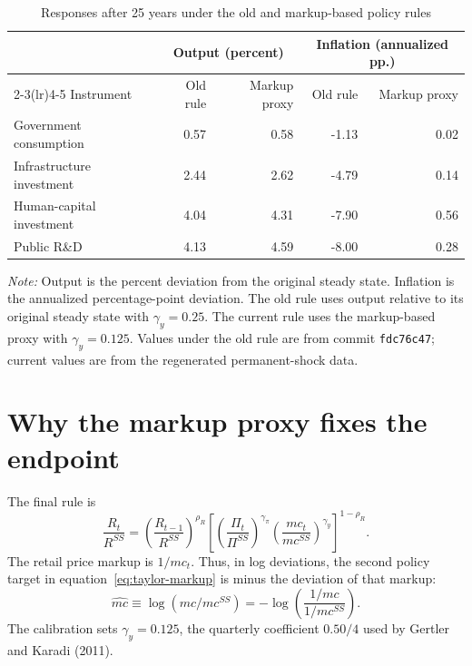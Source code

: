 \documentclass[10pt]{article}
\newcommand{\ssval}[1]{{#1}^{SS}}
\begin{document}
\begin{table}[ht]
    \centering
    \small
    \caption{Responses after 25 years under the old and markup-based policy rules}
    \label{tab:comparison}
    \begin{tabular}{lrrrr}
        \toprule
        & \multicolumn{2}{c}{Output (percent)}
        & \multicolumn{2}{c}{Inflation (annualized pp.)} \\
        \cmidrule(lr){2-3}\cmidrule(lr){4-5}
        Instrument & Old rule & Markup proxy & Old rule & Markup proxy \\
        \midrule
        Government consumption    & 0.57 & 0.58 & -1.13 & 0.02 \\
        Infrastructure investment & 2.44 & 2.62 & -4.79 & 0.14 \\
        Human-capital investment  & 4.04 & 4.31 & -7.90 & 0.56 \\
        Public R\&D                & 4.13 & 4.59 & -8.00 & 0.28 \\
        \bottomrule
    \end{tabular}

    \vspace{0.4em}
    \parbox{0.92\textwidth}{\footnotesize
    \textit{Note:} Output is the percent deviation from the original steady state.
    Inflation is the annualized percentage-point deviation.
    The old rule uses output relative to its original steady state with
    $\gamma_y=0.25$. The current rule uses the markup-based proxy with
    $\gamma_y=0.125$. Values under the old rule are from commit
    \texttt{fdc76c47}; current values are from the regenerated permanent-shock data.}
\end{table}

\section{Why the markup proxy fixes the endpoint}

The final rule is
\begin{equation}\label{eq:taylor-markup}
    \frac{R_t}{\ssval{R}}
    =
    \left(\frac{R_{t-1}}{\ssval{R}}\right)^{\rho_R}
    \left[
        \left(\frac{\Pi_t}{\ssval{\Pi}}\right)^{\gamma_\pi}
        \left(\frac{mc_t}{\ssval{mc}}\right)^{\gamma_y}
    \right]^{1-\rho_R}.
\end{equation}
The retail price markup is $1/mc_t$.
Thus, in log deviations, the second policy target in
equation~\eqref{eq:taylor-markup} is minus the deviation of that markup:
\begin{equation}
    \widehat{mc}
    \equiv \log(mc/\ssval{mc})
    =-\log\left(\frac{1/mc}{1/\ssval{mc}}\right).
\end{equation}
The calibration sets $\gamma_y=0.125$, the quarterly coefficient $0.50/4$ used
by Gertler and Karadi (2011).
\end{document}
